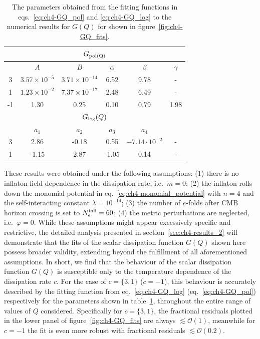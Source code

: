 \begin{table}[ht!]
	\centering
	\begin{tabular}{c|ccccc}
		\toprule
		\hline 
		\multicolumn{6}{c}{$G_{\rm{pol}(Q)}$ }\\
		\hline \diagbox[width=10em]{Value of $c$}{Fit parameters} & $A$ & $B$ & $\alpha$ & $\beta$ &  $\gamma$ \\
		\hline
		3 & $3.57\times10^{-5}$ & $3.71\times10^{-14}$ & 6.52 & 9.78 & - \\
		1 & $1.23\times10^{-2}$ & $7.37\times10^{-17}$ & 2.48 & 6.49 & - \\
		-1 & 1.30 & 0.25 & 0.10 & 0.79 & 1.98 \\
		\hline
		\multicolumn{6}{c}{$G_{\rm{log}}(Q)$}\\
  \hline
  & $a_1$ & $a_2$ & $a_3$ & $a_4$ & \\
		 \hline
		3 & 2.86 & -0.18 & 0.55 & $-7.14\cdot 10^{-2}$ & - \\
		1 & -1.15 & 2.87 & -1.05 & 0.14 & - \\		
		\hline
		\bottomrule
	\end{tabular}
	\caption[Best-fit parameters for the $G(Q)$ fitting functions]{The parameters obtained from the fitting functions in eqs.~\eqref{eq:ch4-GQ_pol} and \eqref{eq:ch4-GQ_log} to the numerical results for $G(Q)$ for shown in figure~\ref{fig:ch4-GQ_fits}.}
	\label{tab:ch4-1}
\end{table}
These results were obtained under the following assumptions: (1) there is no inflaton field dependence in the dissipation rate, i.e.\ $m=0$; (2) the inflaton rolls down the monomial potential in eq.~\eqref{eq:ch4-monomial_potential} with $n=4$ and the self-interacting constant $\lambda=10^{-14}$; (3) the number of $e$-folds after CMB horizon crossing is set to  $N_e^{\rm{infl}}=60$; (4) the metric perturbations are neglected, i.e.\ $\varphi=0$. 
While these assumptions might appear excessively specific and restrictive, the detailed analysis presented in section~\ref{sec:ch4-results_2} will demonstrate that the fits of the scalar dissipation function $G(Q)$ shown here possess broader validity, extending beyond the fulfillment of all aforementioned assumptions. In short, we find that the behaviour of the scalar dissipation function $G(Q)$ is susceptible only to the temperature dependence of the dissipation rate $c$. For the case of $c=\{3,1\}$ ($c=-1$), this behaviour is accurately described by the fitting function from eq.~\eqref{eq:ch4-GQ_log} (eq.~\eqref{eq:ch4-GQ_pol}) respectively for the parameters shown in table~\ref{tab:ch4-1}, throughout the entire range of values of $Q$ considered. Specifically for $c=\{3,1\}$, the fractional residuals plotted in the lower panel of figure~\ref{fig:ch4-GQ_fits} are always $\lesssim\mathcal{O}(1)$, meanwhile for $c=-1$ the fit is even more robust with fractional residuals $\lesssim \mathcal{O}(0.2)$.

